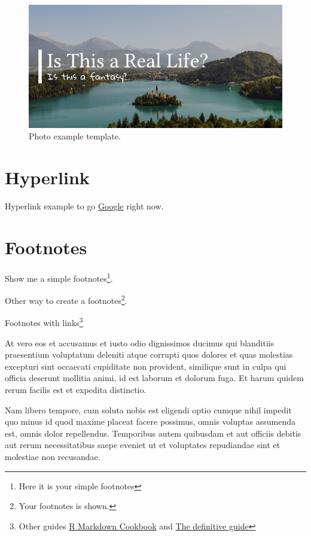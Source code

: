 \documentclass[
  english,
  a4paper,
  openany]{book}
\begin{document}
\begin{figure}

{\centering \includegraphics[width=1\linewidth]{images/photo-example} 

}

\caption{Photo example template.}\label{fig:rmarkdown}
\end{figure}

\hypertarget{hyperlink}{%
\chapter{Hyperlink}\label{hyperlink}}

Hyperlink example to go \href{https://www.google.com}{Google} right now.

\hypertarget{footnotes}{%
\chapter{Footnotes}\label{footnotes}}

Show me a simple footnotes\footnote{Here it is your simple footnotes}.

Other way to create a footnotes\footnote{Your footnotes is shown.}.

Footnotes with links\footnote{Other guides \href{https://bookdown.org/yihui/rmarkdown-cookbook/}{R Markdown Cookbook} and \href{https://bookdown.org/yihui/rmarkdown/}{The definitive guide}}

At vero eos et accusamus et iusto odio dignissimos ducimus qui blanditiis praesentium voluptatum deleniti atque corrupti quos dolores et quas molestias excepturi sint occaecati cupiditate non provident, similique sunt in culpa qui officia deserunt mollitia animi, id est laborum et dolorum fuga. Et harum quidem rerum facilis est et expedita distinctio.

Nam libero tempore, cum soluta nobis est eligendi optio cumque nihil impedit quo minus id quod maxime placeat facere possimus, omnis voluptas assumenda est, omnis dolor repellendus. Temporibus autem quibusdam et aut officiis debitis aut rerum necessitatibus saepe eveniet ut et voluptates repudiandae sint et molestiae non recusandae.
\end{document}
